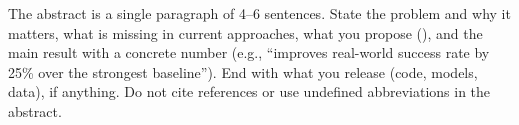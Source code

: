 
The abstract is a single paragraph of 4--6 sentences. State the problem and why it matters, what is missing in current approaches, what you propose (\method), and the main result with a concrete number (e.g., ``\method improves real-world success rate by 25\% over the strongest baseline''). End with what you release (code, models, data), if anything. Do not cite references or use undefined abbreviations in the abstract.

